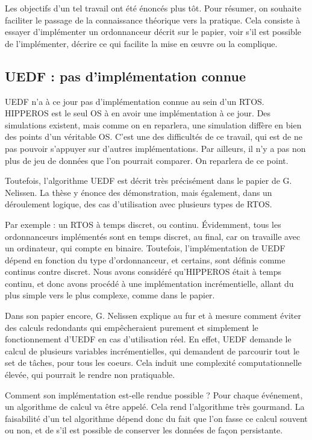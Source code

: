 	Les objectifs d'un tel travail ont été énoncés plus tôt. 
	Pour résumer, on souhaite faciliter le passage de la connaissance théorique vers la pratique.
	Cela consiste à essayer d'implémenter un ordonnanceur décrit sur le papier, voir s'il est 
	possible de l'implémenter, décrire ce qui facilite la mise en œuvre ou la complique. 
	
	
	\subsection{UEDF : pas d'implémentation connue}
	UEDF n'a à ce jour pas d'implémentation connue au sein d'un RTOS. HIPPEROS est le seul OS à en 
	avoir une implémentation à ce jour. Des simulations existent, mais comme on en reparlera, une simulation diffère 
	en bien des points d'un véritable OS. C'est une des difficultés de ce travail, qui est de ne pas pouvoir 
	s'appuyer sur d'autres implémentations. Par ailleurs, il n'y a pas non plus de jeu de données que l'on 
	pourrait comparer. On reparlera de ce point. 
	
	Toutefois, l'algorithme UEDF est décrit très précisément dans le papier de G. Nelissen. La thèse y énonce 
	des démonstration, mais également, dans un déroulement logique, des cas d'utilisation avec 
	plusieurs types de RTOS. 
	
	Par exemple : un RTOS à temps discret, ou continu. 
	Évidemment, tous les ordonnanceurs implémentés sont en temps discret, au final, car on travaille avec 
	un ordinateur, qui compte en binaire. Toutefois, l'implémentation de UEDF dépend en fonction du type 
	d'ordonnanceur, et certains,  sont définis comme continus 
	contre discret. Nous avons considéré qu'HIPPEROS était à temps continu, et donc avons procédé à une implémentation incrémentielle, allant du plus simple vers le plus complexe, comme dans le papier.
	
	
	Dans son papier encore, G. Nelissen explique au fur et à mesure comment éviter des calculs 
	redondants qui empêcheraient purement et simplement le fonctionnement d'UEDF en cas d'utilisation réel.
	 En effet, UEDF demande le calcul de plusieurs variables incrémentielles, 
	qui demandent de parcourir tout le set de tâches, pour tous les coeurs. Cela induit une complexité computationnelle 
	élevée, qui pourrait le rendre non pratiquable.
	
	Comment son implémentation est-elle rendue possible ? Pour chaque événement, un algorithme de calcul va être appelé.
	Cela rend l'algorithme très gourmand. La faisabilité d'un tel algorithme dépend donc du fait que l'on fasse ce calcul souvent ou non, et de s'il est possible de conserver les données de façon persistante. 
	
